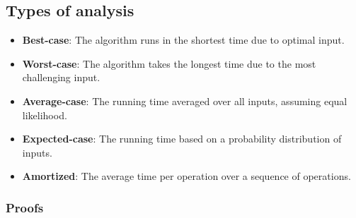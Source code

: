 \subsection{Types of analysis}
\begin{definition}
    \begin{itemize}
        \item \textbf{Best-case}: The algorithm runs in the shortest time due to optimal input.
        \item \textbf{Worst-case}: The algorithm takes the longest time due to the most challenging input.
        \item \textbf{Average-case}: The running time averaged over all inputs, assuming equal likelihood.
        \item \textbf{Expected-case}: The running time based on a probability distribution of inputs.
        \item \textbf{Amortized}: The average time per operation over a sequence of operations.
    \end{itemize}
\end{definition}

\subsubsection{Proofs}


